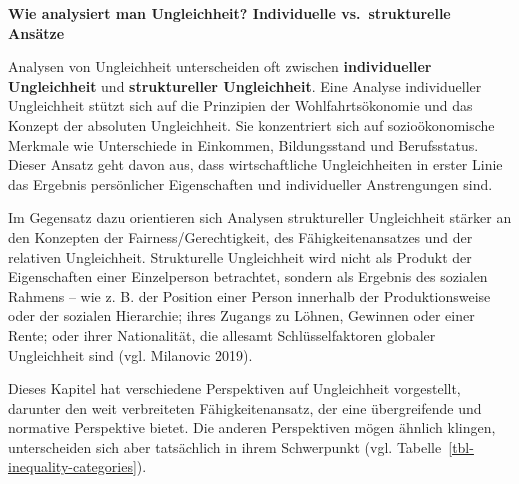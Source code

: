 \documentclass[
  nswissgerman,
  a4paper,
  openany]{book}
\begin{document}
\textbf{Wie analysiert man Ungleichheit? Individuelle vs.~strukturelle
Ansätze}

Analysen von Ungleichheit unterscheiden oft zwischen
\textbf{individueller Ungleichheit} und \textbf{struktureller
Ungleichheit}. Eine Analyse individueller Ungleichheit stützt sich auf
die Prinzipien der Wohlfahrtsökonomie und das Konzept der absoluten
Ungleichheit. Sie konzentriert sich auf sozioökonomische Merkmale wie
Unterschiede in Einkommen, Bildungsstand und Berufsstatus. Dieser Ansatz
geht davon aus, dass wirtschaftliche Ungleichheiten in erster Linie das
Ergebnis persönlicher Eigenschaften und individueller Anstrengungen
sind.

Im Gegensatz dazu orientieren sich Analysen struktureller Ungleichheit
stärker an den Konzepten der Fairness/Gerechtigkeit, des
Fähigkeitenansatzes und der relativen Ungleichheit. Strukturelle
Ungleichheit wird nicht als Produkt der Eigenschaften einer Einzelperson
betrachtet, sondern als Ergebnis des sozialen Rahmens -- wie z. B. der
Position einer Person innerhalb der Produktionsweise oder der sozialen
Hierarchie; ihres Zugangs zu Löhnen, Gewinnen oder einer Rente; oder
ihrer Nationalität, die allesamt Schlüsselfaktoren globaler Ungleichheit
sind (vgl. Milanovic 2019).

Dieses Kapitel hat verschiedene Perspektiven auf Ungleichheit
vorgestellt, darunter den weit verbreiteten Fähigkeitenansatz, der eine
übergreifende und normative Perspektive bietet. Die anderen Perspektiven
mögen ähnlich klingen, unterscheiden sich aber tatsächlich in ihrem
Schwerpunkt (vgl. Tabelle~\ref{tbl-inequality-categories}).

\begingroup\fontsize{8}{10}\selectfont
\end{document}
